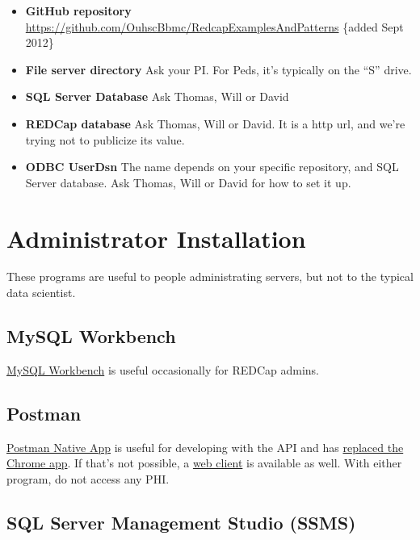 \documentclass[
]{book}
\begin{document}
\begin{itemize}
\item
  \textbf{GitHub repository} \url{https://github.com/OuhscBbmc/RedcapExamplesAndPatterns} \{added Sept 2012\}
\item
  \textbf{File server directory} Ask your PI. For Peds, it's typically on the ``S'' drive.
\item
  \textbf{SQL Server Database} Ask Thomas, Will or David
\item
  \textbf{REDCap database} Ask Thomas, Will or David. It is a http url, and we're trying not to publicize its value.
\item
  \textbf{ODBC UserDsn} The name depends on your specific repository, and SQL Server database. Ask Thomas, Will or David for how to set it up.
\end{itemize}

\hypertarget{workstation-administrator}{%
\section{Administrator Installation}\label{workstation-administrator}}

These programs are useful to people administrating servers, but not to the typical data scientist.

\hypertarget{workstation-mysql}{%
\subsection{MySQL Workbench}\label{workstation-mysql}}

\href{https://dev.mysql.com/downloads/workbench/}{MySQL Workbench} is useful occasionally for REDCap admins.

\hypertarget{workstation-postman}{%
\subsection{Postman}\label{workstation-postman}}

\href{https://www.getpostman.com/downloads/}{Postman Native App} is useful for developing with the API and has \href{https://blog.getpostman.com/2017/03/14/going-native/}{replaced the Chrome app}. If that's not possible, a \href{https://web.postman.co/}{web client} is available as well. With either program, do not access any PHI.

\hypertarget{workstation-ssms}{%
\subsection{SQL Server Management Studio (SSMS)}\label{workstation-ssms}}
\end{document}
